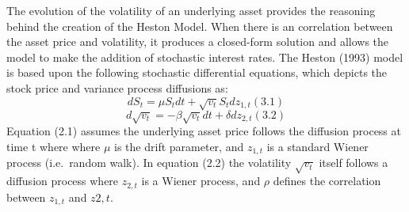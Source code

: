 \documentclass[11pt,]{article}
\begin{document}
The evolution of the volatility of an underlying asset provides the
reasoning behind the creation of the Heston Model. When there is an
correlation between the asset price and volatility, it produces a
closed-form solution and allows the model to make the addition of
stochastic interest rates. The Heston (1993) model is based upon the
following stochastic differential equations, which depicts the stock
price and variance process diffusions as: \[
dS_{t} = \mu S_{t} dt + \sqrt{v_{t}} S_{t} dz_{1,t}                 (3.1)
\] \[ 
d\sqrt{v_{t}} = -\beta \sqrt{v_{t}} dt + \delta dz_{2,t}            (3.2)
\] Equation (2.1) assumes the underlying asset price follows the
diffusion process at time t where where \(\mu\) is the drift parameter,
and \(z_{1,t}\) is a standard Wiener process (i.e.~random walk). In
equation (2.2) the volatility \(\sqrt{v_{t}}\) itself follows a
diffusion process where \(z_{2,t}\) is a Wiener process, and \(\rho\)
defines the correlation between \(z_{1,t}\) and \(z{2,t}\).
\end{document}
